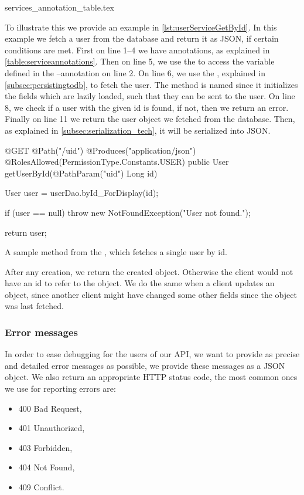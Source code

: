 {services_annotation_table.tex}

\bigskip
To illustrate this we provide an example in \cref{lst:userServiceGetById}.
In this example we fetch a user from the database and return it as JSON, if certain conditions are met.
First on line 1--4 we have annotations, as explained in \cref{table:serviceannotations}.
Then on line 5, we use the  to access the variable defined in the --annotation on line 2.
On line 6, we use the , explained in \cref{subsec:persistingtodb}, to fetch the user.
The method is named  since it initializes the fields which are lazily loaded, such that they can be sent to the user.
On line 8, we check if a user with the given id is found, if not, then we return an error.
Finally on line 11 we return the user object we fetched from the database.
Then, as explained in \cref{subsec:serialization_tech}, it will be serialized into JSON.
\begin{listing}
    \begin{java2}
@GET
@Path("/{uid}")
@Produces("application/json")
@RolesAllowed({PermissionType.Constants.USER})
public User getUserById(@PathParam("uid") Long id) {
    User user = userDao.byId_ForDisplay(id);

    if (user == null)
        throw new NotFoundException("User not found.");

    return user;
}
    \end{java2}
    \caption{A sample method from the , which fetches a single user by id.}\label{lst:userServiceGetById}
\end{listing}

After any creation, we return the created object. 
Otherwise the client would not have an id to refer to the object.
We do the same when a client updates an object, 
since another client might have changed some other fields since the object was last fetched. 

\bigskip
\subsubsection{Error messages}
In order to ease debugging for the users of our API, we want to provide as precise and detailed error messages as possible,
we provide these messages as a JSON object.
We also return an appropriate HTTP status code, the most common ones we use for reporting errors are:
\begin{multicols}{3}
\begin{itemize}
    \item 400 Bad Request,
    \item 401 Unauthorized,
    \item 403 Forbidden,
    \item 404 Not Found,
    \item 409 Conflict.
\end{itemize}
\end{multicols}

